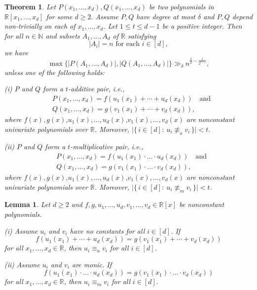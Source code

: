 \documentclass[10pt,a4paper]{amsart}
\newtheorem{theorem}{Theorem}
\newtheorem{lemma}{Lemma}
\begin{document}
\begin{theorem}\label{thm:main2} Let $P(x_{1},\ldots,x_{d}),Q(x_{1},\ldots,x_{d})$ be two polynomials in $ \mathbb{R}[x_{1},\ldots,x_{d}]$  for some $d\geq 2.$ Assume $P,Q$ have degree at most $\delta$ and $P,Q$ depend  non-trivially on each of $x_1,...,x_d$. Let $1\leq t\leq d-1$ be a positive integer. Then for all $n \in \mathbb{N}$ and subsets $A_{1},\ldots, A_{d}$ of $\mathbb{R}$ satisfying \[|A_{i}|=n \text{~for each~} i\in [d],\] we have
$$
\max \{|P(A_{1},\ldots, A_{d})|,|Q(A_{1},\ldots, A_{d})|\} \gg_{\delta} n^{\frac{3}{2}-\frac{1}{2^{t+1}}},
$$
unless one of the following holds:

(i) $P$ and $Q$ form a $t$-additive pair, i.e., \begin{align*}&P(x_{1},\ldots,x_{d})=f( u_{1}(x_{1})+\cdots+ u_{d}(x_{d}))\quad \text{and}\\&Q(x_{1},\ldots,x_{d})=g( v_{1}(x_{1})+\cdots+v_{d}(x_{d})),\end{align*} where $f(x), g(x)$,$u_{1}(x),\ldots,u_{d}(x)$,$v_{1}(x),\ldots,v_{d}(x)$ are nonconstant univariate polynomials over $\mathbb{R}$. Moreover, \(\bigl|\{\,i\in[d]:\ u_i \not\equiv_a v_i\,\}\bigr|<t.\)






(ii) $P$ and $Q$ form a $t$-multiplicative pair, i.e.,  \begin{align*}&P(x_{1},\ldots,x_{d})=f( u_{1}(x_{1})\cdot\ldots\cdot u_{d}(x_{d}))\quad \text{and}\\&Q(x_{1},\ldots,x_{d})=g( v_{1}(x_{1}) \cdot\ldots\cdot v_{d}(x_{d})),\end{align*}
where $f(x), g(x)$,$u_{1}(x),\ldots,u_{d}(x)$,$v_{1}(x),\ldots,v_{d}(x)$  are nonconstant univariate polynomials over $\mathbb{R}$.  Moreover, \(\bigl|\{\,i\in[d]:\ u_i \not\equiv_m v_i\,\}\bigr|<t.\)




\end{theorem}

\begin{lemma}\label{lem:poly}
Let $d\geq 2$ and $f,g,u_{1},\ldots,u_{d},v_{1},\ldots,v_{d}\in \mathbb{R}[x]$ be nonconstant polynomials.

(i)  Assume $u_{i}$ and $v_{i}$ have no constants for all $i\in[d]$. If
$$f(u_{1}(x_{1})+\cdots+u_{d}(x_{d}))=g(v_{1}(x_{1})+\cdots+v_{d}(x_{d}))$$
for all $x_{1},\ldots,x_{d}\in\mathbb{R}$, then $u_{i}\equiv_{a} v_{i}$ for all $i\in[d]$.

(ii) Assume $u_{i}$ and $v_{i}$ are monic. If
$$f(u_{1}(x_{1})\cdot\ldots\cdot u_{d}(x_{d}))=g(v_{1}(x_{1}) \cdot\ldots\cdot v_{d}(x_{d}))$$
for all $x_{1},\ldots,x_{d}\in\mathbb{R}$, then $u_{i}\equiv_{m} v_{i}$ for all $i\in[d].$
\end{lemma}
\end{document}
